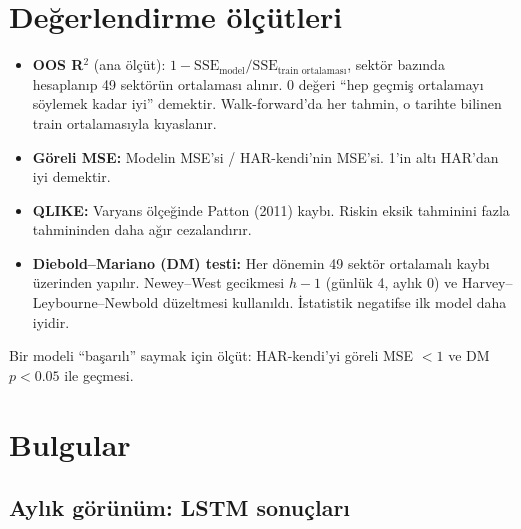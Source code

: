 \documentclass[11pt,a4paper]{article}
\newcommand{\Rsq}{R$^2$}
\begin{document}
\section{Değerlendirme ölçütleri}
\begin{itemize}
  \item \textbf{OOS \Rsq{}} (ana ölçüt): $1 - \text{SSE}_{\text{model}} / \text{SSE}_{\text{train ortalaması}}$, sektör bazında
        hesaplanıp 49 sektörün ortalaması alınır. 0 değeri ``hep geçmiş ortalamayı söylemek kadar iyi'' demektir.
        Walk-forward'da her tahmin, o tarihte bilinen train ortalamasıyla kıyaslanır.
  \item \textbf{Göreli MSE:} Modelin MSE'si / HAR-kendi'nin MSE'si. 1'in altı HAR'dan iyi demektir.
  \item \textbf{QLIKE:} Varyans ölçeğinde Patton (2011) kaybı. Riskin eksik tahminini fazla tahmininden daha ağır cezalandırır.
  \item \textbf{Diebold--Mariano (DM) testi:} Her dönemin 49 sektör ortalamalı kaybı üzerinden yapılır. Newey--West gecikmesi
        $h-1$ (günlük 4, aylık 0) ve Harvey--Leybourne--Newbold düzeltmesi kullanıldı. İstatistik negatifse ilk model daha iyidir.
\end{itemize}
Bir modeli ``başarılı'' saymak için ölçüt: HAR-kendi'yi göreli MSE $<1$ ve DM $p<0.05$ ile geçmesi.

\section{Bulgular}

\subsection{Aylık görünüm: LSTM sonuçları}
\end{document}
